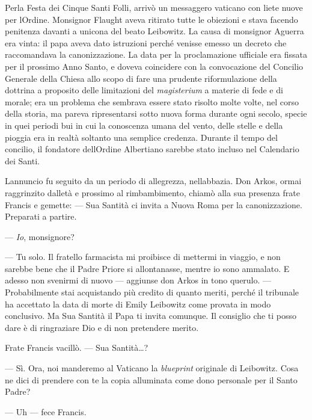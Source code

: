 Perla Festa dei Cinque Santi Folli, arrivò un messaggero vaticano con
liete nuove per l\textquotesingle Ordine. Monsignor Flaught aveva
ritirato tutte le obiezioni e stava facendo penitenza davanti a
un\textquotesingle icona del beato Leibowitz. La causa di monsignor
Aguerra era vinta: il papa aveva dato istruzioni perché venisse emesso
un decreto che raccomandava la canonizzazione. La data per la
proclamazione ufficiale era fissata per il prossimo Anno Santo, e doveva
coincidere con la convocazione del Concilio Generale della Chiesa allo
scopo di fare una prudente riformulazione della dottrina a proposito
delle limitazioni del \emph{magisterium} a materie di fede e di morale;
era un problema che sembrava essere stato risolto molte volte, nel corso
della storia, ma pareva ripresentarsi sotto nuova forma durante ogni
secolo, specie in quei periodi bui in cui la conoscenza umana del vento,
delle stelle e della pioggia era in realtà soltanto una semplice
credenza. Durante il tempo del concilio, il fondatore
dell\textquotesingle Ordine Albertiano sarebbe stato incluso nel
Calendario dei Santi.

L\textquotesingle annuncio fu seguito da un periodo di allegrezza,
nell\textquotesingle abbazia. Don Arkos, ormai raggrinzito
dall\textquotesingle età e prossimo al rimbambimento, chiamò alla sua
presenza frate Francis e gemette: --- Sua Santità ci invita a Nuova Roma
per la canonizzazione. Preparati a partire.

--- \emph{Io}, monsignore?

--- Tu solo. Il fratello farmacista mi proibisce di mettermi in viaggio,
e non sarebbe bene che il Padre Priore si allontanasse, mentre io sono
ammalato. E adesso non svenirmi di nuovo --- aggiunse don Arkos in tono
querulo. --- Probabilmente stai acquistando più credito di quanto
meriti, perché il tribunale ha accettato la data di morte di Emily
Leibowitz come provata in modo conclusivo. Ma Sua Santità il Papa ti
invita comunque. Il consiglio che ti posso dare è di ringraziare Dio e
di non pretendere merito.

Frate Francis vacillò. --- Sua Santità\ldots?

--- Sì. Ora, noi manderemo al Vaticano la \emph{blueprint} originale di
Leibowitz. Cosa ne dici di prendere con te la copia alluminata come dono
personale per il Santo Padre?

--- Uh --- fece Francis.
